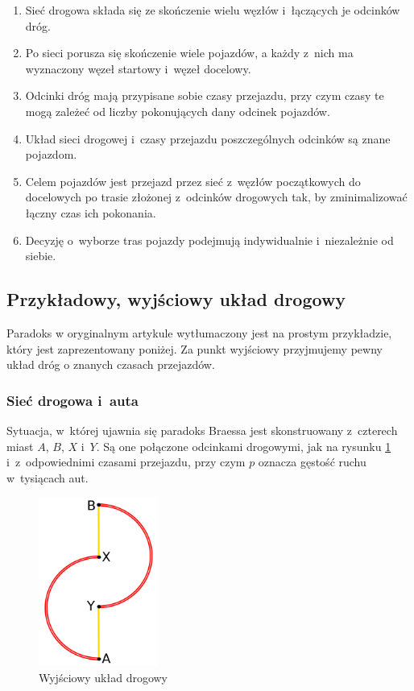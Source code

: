 \documentclass[twoside,12pt]{report}
\begin{document}
\begin{enumerate}
\item Sieć drogowa składa się ze skończenie wielu węzłów i~łączących je odcinków dróg.
\item Po sieci porusza się skończenie wiele pojazdów, a każdy z~nich ma wyznaczony węzeł startowy i~węzeł docelowy.
\item Odcinki dróg mają przypisane sobie czasy przejazdu, przy czym czasy te mogą zależeć od liczby pokonujących dany odcinek pojazdów.
\item Układ sieci drogowej i~czasy przejazdu poszczególnych odcinków są znane pojazdom.
\item Celem pojazdów jest przejazd przez sieć z~węzłów początkowych do docelowych po trasie złożonej z~odcinków drogowych tak, by zminimalizować łączny czas ich pokonania.
\item Decyzję o~wyborze tras pojazdy podejmują indywidualnie i~niezależnie od siebie.
\end{enumerate}

\subsection{Przykładowy, wyjściowy układ drogowy}

Paradoks w oryginalnym artykule wytłumaczony jest na prostym przykładzie, który jest zaprezentowany poniżej. Za punkt wyjściowy przyjmujemy pewny układ dróg o znanych czasach przejazdów.

\subsubsection{Sieć drogowa i~auta}

Sytuacja, w~której ujawnia się paradoks Braessa jest skonstruowany z~czterech miast $A$, $B$, $X$ i~$Y$. Są one połączone odcinkami drogowymi, jak na rysunku \ref{fig:wyjsciowy_uklad_drogowy} i~z~odpowiednimi czasami przejazdu, przy czym $p$ oznacza gęstość ruchu w~tysiącach aut.

\begin{figure}[ht]
	\centering
	\includegraphics[width=0.35\textwidth]{img/braess1}
	\caption{Wyjściowy układ drogowy}
	\label{fig:wyjsciowy_uklad_drogowy}
\end{figure}
\end{document}
